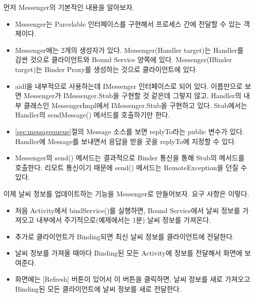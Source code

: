 먼저 Messenger의 기본적인 내용을 알아보자. 
\begin{itemize}
\item Messenger는 Parcelable 인터페이스를 구현해서 프로세스 간에 전달할 수 있는 객체이다.

\item Messenger에는 2개의 생성자가 있다. Messenger(Handler target)는 Handler를 감싼 것으로 클라이언트와 Bound Service 양쪽에 있다. 
Messenger(IBinder target)는 Binder Proxy를 생성하는 것으로 클라이언트에 있다.

\item aidl을 내부적으로 사용하는데 IMessenger 인터페이스로 되어 있다. 
이름만으로 보면 Messenger가 IMessenger.Stub을 구현할 것 같은데 그렇지 않고, Handler의 내부 클래스인 MessengerImpl에서 IMessenger.Stub을 구현하고 있다. 
Stub에서는 Handler의 sendMessage() 메서드를 호출하기만 한다.

\item \ref{sec:messagequeue}절의 Message 소스를 보면 replyTo라는 public 변수가 있다. Handler에 Message를 보내면서 응답을 받을 곳을 replyTo에 지정할 수 있다.

\item Messenger의 send() 메서드는 결과적으로 Binder 통신을 통해 Stub의 메서드를 호출한다. 리모트 통신이기 때문에 send() 메서드는 RemoteException을 던질 수 있다. 
\end{itemize}

이제 날씨 정보를 업데이트하는 기능을 Messenger로 만들어보자. 요구 사항은 이렇다.
\begin{itemize}
\item 처음 Activity에서 bindService()를 실행하면, Bound Service에서 날씨 정보를 가져오고 내부에서 주기적으로(예제에서는 1분) 날씨 정보를 가져온다.
\item 추가로 클라이언트가 Binding되면 최신 날씨 정보를 클라이언트에 전달한다.
\item 날씨 정보를 가져올 때마다 Binding된 모든 Activity에 정보를 전달해서 화면에 보여준다.
\item 화면에는 [Refresh] 버튼이 있어서 이 버튼을 클릭하면, 날씨 정보를 새로 가져오고 Binding된 모든 클라이언트에 날씨 정보를 새로 전달한다.
\end{itemize}


